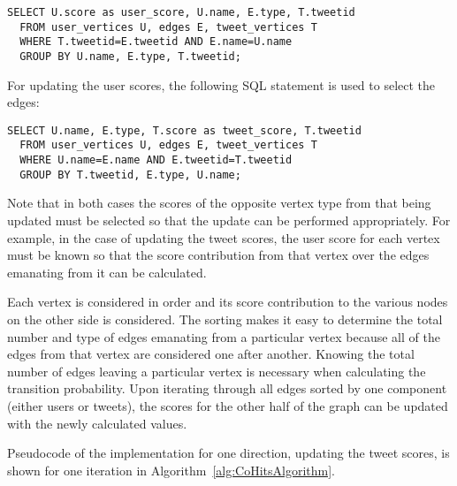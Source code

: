 \begin{verbatim}
SELECT U.score as user_score, U.name, E.type, T.tweetid
  FROM user_vertices U, edges E, tweet_vertices T
  WHERE T.tweetid=E.tweetid AND E.name=U.name
  GROUP BY U.name, E.type, T.tweetid;
\end{verbatim}

\noindent
For updating the user scores, the following SQL statement is used to select the edges:

\begin{verbatim}
SELECT U.name, E.type, T.score as tweet_score, T.tweetid
  FROM user_vertices U, edges E, tweet_vertices T
  WHERE U.name=E.name AND E.tweetid=T.tweetid
  GROUP BY T.tweetid, E.type, U.name;
\end{verbatim}

\noindent
Note that in both cases the scores of the opposite vertex type from that being updated must be selected so that the update can be performed appropriately. For example, in the case of updating the tweet scores, the user score for each vertex must be known so that the score contribution from that vertex over the edges emanating from it can be calculated.

Each vertex is considered in order and its score contribution to the various nodes on the other side is considered. The sorting makes it easy to determine the total number and type of edges emanating from a particular vertex because all of the edges from that vertex are considered one after another. Knowing the total number of edges leaving a particular vertex is necessary when calculating the transition probability. Upon iterating through all edges sorted by one component (either users or tweets), the scores for the other half of the graph can be updated with the newly calculated values.

Pseudocode of the implementation for one direction, updating the tweet scores, is shown for one iteration in Algorithm~\ref{alg:CoHitsAlgorithm}.


